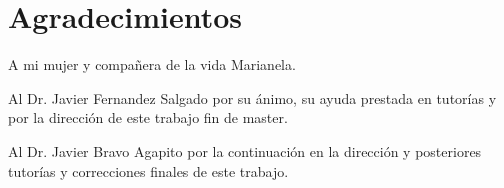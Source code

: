 \chapter{Agradecimientos}
 
A mi mujer y compañera de la vida Marianela.

Al Dr. Javier Fernandez Salgado por su ánimo, su ayuda prestada en tutorías y por la dirección de este trabajo fin de master.

Al Dr. Javier Bravo Agapito por la continuación en la dirección y posteriores tutorías y correcciones finales de este trabajo.
